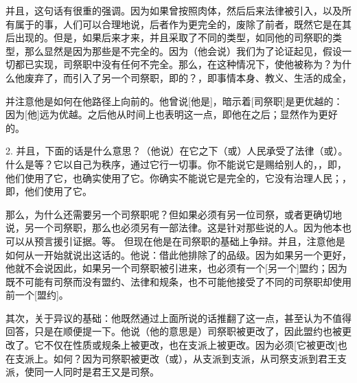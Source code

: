 并且，这句话有很重的强调。因为如果曾按照肉体，然后后来法律被引入，以及所有属于的事，人们可以合理地说，后者作为更完全的，废除了前者，既然它是在其后出现的。但是，如果后来才来，并且采取了不同的类型，如同他的司祭职的类型，那么显然是因为那些是不完全的。因为（他会说）我们为了论证起见，假设一切都已实现，司祭职中没有任何不完全。那么，在这种情况下，使他被称为？为什么他废弃了，而引入了另一个司祭职，即的？，即事情本身、教义、生活的成全，\par

并注意他是如何在他路径上向前的。他曾说[他是]，暗示着[司祭职]是更优越的：因为[他]远为优越。之后他从时间上也表明这一点，即他在之后；显然作为更好的。\par

2. 并且，下面的话是什么意思？（他说）在它之下（或）人民承受了法律（或）。什么是等？它以自己为秩序，通过它行一切事。你不能说它是赐给别人的，，即，他们使用了它，也确实使用了它。你确实不能说它是完全的，它没有治理人民；，即，他们使用了它。\par

那么，为什么还需要另一个司祭职呢？但如果必须有另一位司祭，或者更确切地说，另一个司祭职，那么也必须另有一部法律。这是针对那些说的人。因为他本也可以从预言援引证据。等。 但现在他是在司祭职的基础上争辩。并且，注意他是如何从一开始就说出这话的。他说：借此他排除了的品级。因为如果另一个更好，他就不会说因此，如果另一个司祭职被引进来，也必须有一个[另一个]盟约；因为既不可能有司祭而没有盟约、法律和规条，也不可能他接受了不同的司祭职却使用前一个[盟约]。\par

其次，关于异议的基础：他既然通过上面所说的话推翻了这一点，甚至认为不值得回答，只是在顺便提一下。他说（他的意思是）司祭职被更改了，因此盟约也被更改了。它不仅在性质或规条上被更改，也在支派上被更改。因为必须[它被更改]也在支派上。如何？因为司祭职被更改（或），从支派到支派，从司祭支派到君王支派，使同一人同时是君王又是司祭。\par


